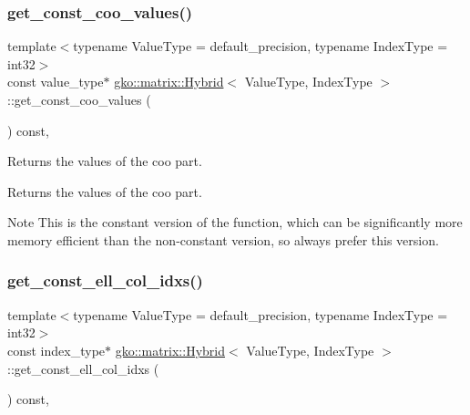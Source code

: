 \subsubsection{\texorpdfstring{get\+\_\+const\+\_\+coo\+\_\+values()}{get\_const\_coo\_values()}}
{\footnotesize\ttfamily template$<$typename Value\+Type = default\+\_\+precision, typename Index\+Type = int32$>$ \\
const value\+\_\+type$\ast$ \hyperlink{classgko_1_1matrix_1_1Hybrid}{gko\+::matrix\+::\+Hybrid}$<$ Value\+Type, Index\+Type $>$\+::get\+\_\+const\+\_\+coo\+\_\+values (\begin{DoxyParamCaption}{ }\end{DoxyParamCaption}) const\hspace{0.3cm}{\ttfamily [inline]}, {\ttfamily [noexcept]}}



Returns the values of the coo part. 

\begin{DoxyReturn}{Returns}
the values of the coo part.
\end{DoxyReturn}
\begin{DoxyNote}{Note}
This is the constant version of the function, which can be significantly more memory efficient than the non-\/constant version, so always prefer this version. 
\end{DoxyNote}
\mbox{\label{classgko_1_1matrix_1_1Hybrid_a7cba3bbddd3f2f921b65bcb8cd208df5}} 
\subsubsection{\texorpdfstring{get\+\_\+const\+\_\+ell\+\_\+col\+\_\+idxs()}{get\_const\_ell\_col\_idxs()}}
{\footnotesize\ttfamily template$<$typename Value\+Type = default\+\_\+precision, typename Index\+Type = int32$>$ \\
const index\+\_\+type$\ast$ \hyperlink{classgko_1_1matrix_1_1Hybrid}{gko\+::matrix\+::\+Hybrid}$<$ Value\+Type, Index\+Type $>$\+::get\+\_\+const\+\_\+ell\+\_\+col\+\_\+idxs (\begin{DoxyParamCaption}{ }\end{DoxyParamCaption}) const\hspace{0.3cm}{\ttfamily [inline]}, {\ttfamily [noexcept]}}



